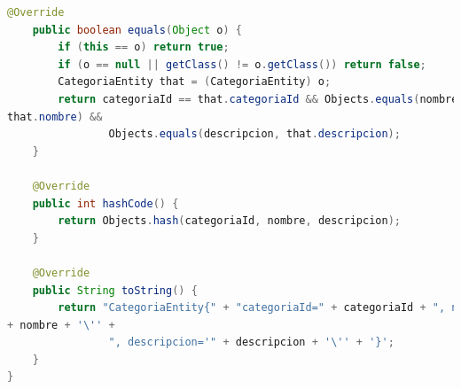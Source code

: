 \documentclass[a4paper,12pt]{article}
\begin{document}
\begin{lstlisting}[language=Java, style=customJava, 
caption={CategoriaEntity.java}, captionpos=b,basicstyle=\fontfamily{cmss}\small]
    @Override
    public boolean equals(Object o) {
        if (this == o) return true;
        if (o == null || getClass() != o.getClass()) return false;
        CategoriaEntity that = (CategoriaEntity) o;
        return categoriaId == that.categoriaId && Objects.equals(nombre, 
that.nombre) &&
                Objects.equals(descripcion, that.descripcion);
    }

    @Override
    public int hashCode() {
        return Objects.hash(categoriaId, nombre, descripcion);
    }

    @Override
    public String toString() {
        return "CategoriaEntity{" + "categoriaId=" + categoriaId + ", nombre='" 
+ nombre + '\'' +
                ", descripcion='" + descripcion + '\'' + '}';
    }
}
\end{lstlisting}
\end{document}
